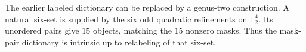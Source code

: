 \makeatletter
{}
\makeatother

\begin{theorem}
\label{thm:intrinsic-pair-dictionary}
The earlier labeled dictionary can be replaced by a genus-two construction.  A
natural six-set is supplied by the six odd quadratic refinements on
$\mathbb F_2^4$.  Its unordered pairs give $15$ objects, matching the $15$
nonzero masks.  Thus the mask-pair dictionary is intrinsic up to relabeling of
that six-set.
\end{theorem}
